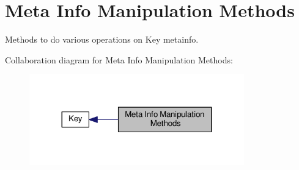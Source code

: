\hypertarget{group__keymeta}{\section{Meta Info Manipulation Methods}
\label{group__keymeta}
}


Methods to do various operations on Key metainfo.  


Collaboration diagram for Meta Info Manipulation Methods\+:
\nopagebreak
\begin{figure}[H]
\begin{center}
\leavevmode
\includegraphics[width=263pt]{group__keymeta}
\end{center}
\end{figure}
